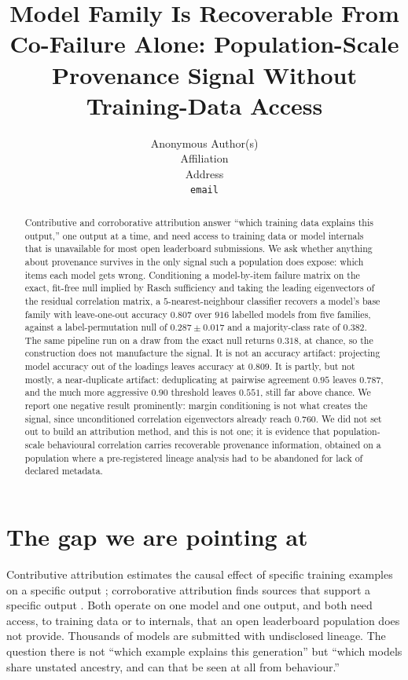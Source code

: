 \documentclass{article}
\title{Model Family Is Recoverable From Co-Failure Alone: Population-Scale Provenance Signal Without Training-Data Access}
\author{
  Anonymous Author(s) \\
  Affiliation \\
  Address \\
  \texttt{email}
}
\begin{document}
\maketitle

\begin{abstract}
Contributive and corroborative attribution answer ``which training data explains this output,''
one output at a time, and need access to training data or model internals that is unavailable for
most open leaderboard submissions. We ask whether anything about provenance survives in the only
signal such a population does expose: which items each model gets wrong. Conditioning a
model-by-item failure matrix on the exact, fit-free null implied by Rasch sufficiency and taking
the leading eigenvectors of the residual correlation matrix, a $5$-nearest-neighbour classifier
recovers a model's base family with leave-one-out accuracy $0.807$ over $916$ labelled models from
five families, against a label-permutation null of $0.287 \pm 0.017$ and a majority-class rate of
$0.382$. The same pipeline run on a draw from the exact null returns $0.318$, at chance, so the
construction does not manufacture the signal. It is not an accuracy artifact: projecting model
accuracy out of the loadings leaves accuracy at $0.809$. It is partly, but not mostly, a
near-duplicate artifact: deduplicating at pairwise agreement $0.95$ leaves $0.787$, and the much
more aggressive $0.90$ threshold leaves $0.551$, still far above chance. We report one negative
result prominently: margin conditioning is not what creates the signal, since unconditioned
correlation eigenvectors already reach $0.760$. We did not set out to build an attribution method,
and this is not one; it is evidence that population-scale behavioural correlation carries
recoverable provenance information, obtained on a population where a pre-registered lineage
analysis had to be abandoned for lack of declared metadata.
\end{abstract}

\section{The gap we are pointing at}

Contributive attribution estimates the causal effect of specific training examples on a specific
output \citep{kohliang2017,park2023trak}; corroborative attribution finds sources that support a
specific output \citep{worledge2024}. Both operate on one model and one output, and both need
access, to training data or to internals, that an open leaderboard population does not provide.
Thousands of models are submitted with undisclosed lineage. The question there is not ``which
example explains this generation'' but ``which models share unstated ancestry, and can that be seen
at all from behaviour.''
\end{document}
